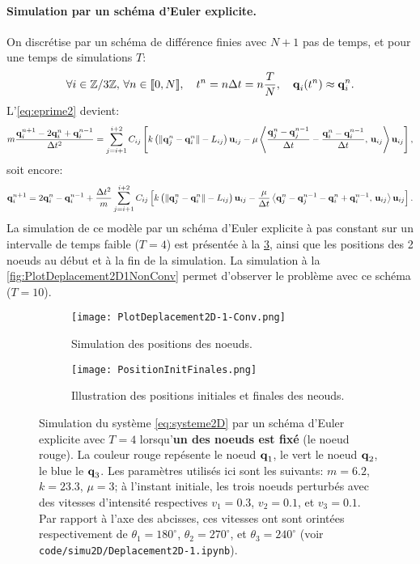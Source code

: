 \paragraph{Simulation par un schéma d'Euler explicite.}

On discrétise par un schéma de différence finies avec $N+1$ pas de temps, et pour une temps de simulations $T$:
$$
\forall i \in \mathbb{Z}/3\mathbb{Z}, \, \forall n \in [\![ 0,N ]\!], \quad  t^n = n\Delta t = n\frac{T}{N}, \quad \bm{\mathrm{q}}_i(t^n) \approx \bm{\mathrm{q}}_i^n.
$$
L'\cref{eq:eprime2} devient:
$$
m\frac{\bm{\mathrm{q}}_{i}^{n+1}-2\bm{\mathrm{q}}_{i}^{n}+\bm{\mathrm{q}}_{i}^{n-1}}{\Delta t^2} = \sum_{j=i+1}^{i+2}C_{ij}\left[ k \left( \Vert \bm{\mathrm{q}}_j^n - \bm{\mathrm{q}}_i^n \Vert - L_{ij} \right) \bm{\mathrm{u}}_{ij} - \mu \left\langle \frac{\bm{\mathrm{q}}_{j}^{n}-\bm{\mathrm{q}}_{j}^{n-1}}{\Delta t} - \frac{\bm{\mathrm{q}}_{i}^{n}-\bm{\mathrm{q}}_{i}^{n-1}}{\Delta t}, \, \bm{\mathrm{u}}_{ij} \right\rangle  \bm{\mathrm{u}}_{ij}  \right],
$$
soit encore:
\begin{align} \label{eq:systeme2D}
    \bm{\mathrm{q}}_{i}^{n+1} = 2\bm{\mathrm{q}}_{i}^{n}-\bm{\mathrm{q}}_{i}^{n-1} + \frac{\Delta t^2}{m} \sum_{j=i+1}^{i+2}C_{ij}\left[ k \left( \Vert \bm{\mathrm{q}}_j^n - \bm{\mathrm{q}}_i^n \Vert - L_{ij} \right) \bm{\mathrm{u}}_{ij} - \frac{\mu}{\Delta t} \left\langle \bm{\mathrm{q}}_{j}^{n}-\bm{\mathrm{q}}_{j}^{n-1} - \bm{\mathrm{q}}_{i}^{n}+\bm{\mathrm{q}}_{i}^{n-1}, \, \bm{\mathrm{u}}_{ij} \right\rangle  \bm{\mathrm{u}}_{ij}  \right].
\end{align}
La simulation de ce modèle par un schéma d'Euler explicite à pas constant sur un intervalle de temps faible ($T = 4$) est présentée à la \cref{fig:PlotDeplacement2D1Conv}, ainsi que les positions des 2 noeuds au début et à la fin de la simulation. La simulation à la \cref{fig:PlotDeplacement2D1NonConv} permet d'observer le problème avec ce schéma ($T = 10$).


\begin{figure}[!h]
    \begin{subfigure}[b]{0.7\textwidth}
        \centering
        \texttt{[image: PlotDeplacement2D-1-Conv.png]}
        \caption{Simulation des positions des noeuds.}
        \label{fig:dep}
    \end{subfigure}
    \begin{subfigure}[b]{0.7\textwidth}
        \centering
        \texttt{[image: PositionInitFinales.png]}
        \caption{Illustration des positions initiales et finales des neouds.}
        \label{fig:pos}
    \end{subfigure}
    \caption{Simulation du système \ref{eq:systeme2D} par un schéma d'Euler explicite avec $T = 4$ lorsqu'\textbf{un des noeuds est fixé} (le noeud rouge). La couleur rouge repésente le noeud $\bm{\mathrm{q}}_1$, le vert le noeud $\bm{\mathrm{q}}_2$, le blue le $\bm{\mathrm{q}}_3$. Les paramètres utilisés ici sont les suivants: $m=6.2$, $k=23.3$, $\mu=3$; à l'instant initiale, les trois noeuds perturbés avec des vitesses d'intensité respectives $v_1=0.3$, $v_2=0.1$, et $v_3=0.1$. Par rapport à l'axe des abcisses, ces vitesses ont sont orintées respectivement de $\theta_1=180^\circ$, $\theta_2=270^\circ$, et $\theta_3=240^\circ$ (voir \texttt{code/simu2D/Deplacement2D-1.ipynb}).}
    \label{fig:PlotDeplacement2D1Conv}
\end{figure}


